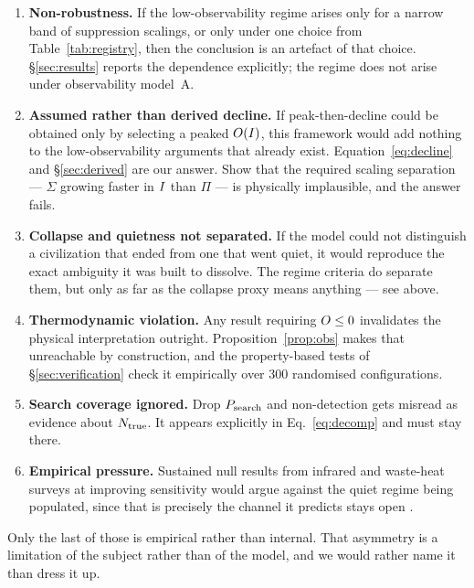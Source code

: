 \begin{enumerate}\itemsep3pt
  \item \textbf{Non-robustness.} If the low-observability regime arises only for
    a narrow band of suppression scalings, or only under one choice from
    Table~\ref{tab:registry}, then the conclusion is an artefact of that choice.
    \S\ref{sec:results} reports the dependence explicitly; the regime does not
    arise under observability model~A.
  \item \textbf{Assumed rather than derived decline.} If peak-then-decline could
    be obtained only by selecting a peaked $O(I)$, this framework would
    add nothing to the low-observability arguments that already exist.
    Equation~\eqref{eq:decline} and \S\ref{sec:derived} are our answer. Show
    that the required scaling separation --- $\Sigma$ growing faster in $I$
    than $\Pi$ --- is physically implausible, and the answer fails.
  \item \textbf{Collapse and quietness not separated.} If the model could not
    distinguish a civilization that ended from one that went quiet, it would
    reproduce the exact ambiguity it was built to dissolve. The regime criteria
    do separate them, but only as far as the collapse proxy means anything --- see
    above.
  \item \textbf{Thermodynamic violation.} Any result requiring $O \leq 0$
    invalidates the physical interpretation outright.
    Proposition~\ref{prop:obs} makes that unreachable by construction, and the
    property-based tests of \S\ref{sec:verification} check it empirically over
    300 randomised configurations.
  \item \textbf{Search coverage ignored.} Drop $P_{\mathrm{search}}$ and non-detection gets
    misread as evidence about $N_{\mathrm{true}}$. It appears explicitly in
    Eq.~\eqref{eq:decomp} and must stay there.
  \item \textbf{Empirical pressure.} Sustained null results from infrared and
    waste-heat surveys at improving sensitivity would argue against the quiet
    regime being populated, since that is precisely the channel it predicts
    stays open \citep{griffith2015,garrett2015,wright2022haystack}.
\end{enumerate}

Only the last of those is empirical rather than internal. That asymmetry is a
limitation of the subject rather than of the model, and we would rather name it
than dress it up.

